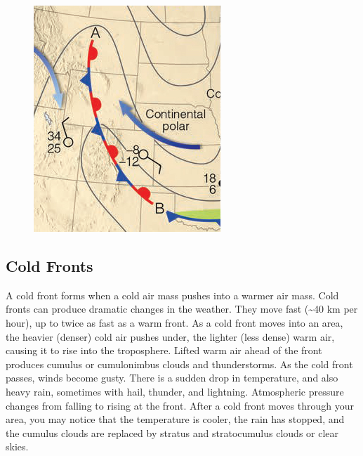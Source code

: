 \documentclass[12pt,oneside]{book}
\begin{document}
\begin{figure}

{\centering \includegraphics[width=0.8\linewidth]{figures/Figure622} 

}

\caption{ }\label{fig:Fig622}
\end{figure}

\subsection{Cold Fronts}\label{cold-fronts}

A cold front forms when a cold air mass pushes into a warmer air mass.
Cold fronts can produce dramatic changes in the weather. They move fast
(\textasciitilde{}40 km per hour), up to twice as fast as a warm front.
As a cold front moves into an area, the heavier (denser) cold air pushes
under, the lighter (less dense) warm air, causing it to rise into the
troposphere. Lifted warm air ahead of the front produces cumulus or
cumulonimbus clouds and thunderstorms. As the cold front passes, winds
become gusty. There is a sudden drop in temperature, and also heavy
rain, sometimes with hail, thunder, and lightning. Atmospheric pressure
changes from falling to rising at the front. After a cold front moves
through your area, you may notice that the temperature is cooler, the
rain has stopped, and the cumulus clouds are replaced by stratus and
stratocumulus clouds or clear skies.
\end{document}
